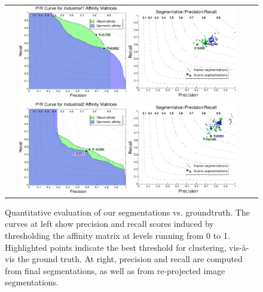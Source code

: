 \begin{figure}
\begin{center}
{{\begin{tabular}{cc}
	      \\
	      \includegraphics[width=0.45\textwidth]{figs/pipes2/validation.pdf}
	      \includegraphics[width=0.45\textwidth]{figs/pipes2/frame_validation.pdf}
	      \\
	      \includegraphics[width=0.45\textwidth]{figs/pipes3/validation.pdf}
	      \includegraphics[width=0.45\textwidth]{figs/pipes3/frame_validation.pdf}
	      \end{tabular}
      }	
   }
\end{center}
{}
\caption{\small Quantitative evaluation of our segmentations vs. groundtruth.
The curves at left show 
precision and recall scores
induced by thresholding the affinity matrix at levels running from 0 to 1.
Highlighted points indicate the best threshold for clustering, vis-\`a-vis the ground truth.
At right, precision
and recall are computed from final segmentations, 
as well as from re-projected image segmentations.}
\label{fig:numericalEval}
{}
\end{figure}

